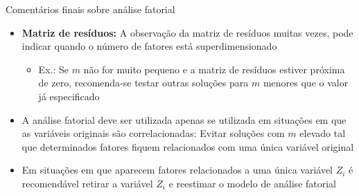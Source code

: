\documentclass[
  ignorenonframetext,
  aspectratio=169,
]{beamer}
\providecommand{\tightlist}{%
  \setlength{\itemsep}{0pt}\setlength{\parskip}{0pt}}
\begin{document}
\begin{frame}{Comentários finais sobre análise fatorial}
\label{comentuxe1rios-finais-sobre-anuxe1lise-fatorial}
\begin{itemize}
\tightlist
\item
  \textbf{Matriz de resíduos:} A observação da matriz de resíduos muitas
  vezes, pode indicar quando o número de fatores está superdimensionado

  \begin{itemize}
  \tightlist
  \item
    Ex.: Se \(m\) não for muito pequeno e a matriz de resíduos estiver
    próxima de zero, recomenda-se testar outras soluções para \(m\)
    menores que o valor já especificado
  \end{itemize}
\end{itemize}

\vspace{0.3cm}

\pause

\begin{itemize}
\tightlist
\item
  A análise fatorial deve ser utilizada apenas se utilizada em situações
  em que as variáveis originais são correlacionadas: Evitar soluções com
  \(m\) elevado tal que determinados fatores fiquem relacionados com uma
  única variável original
\end{itemize}

\vspace{0.3cm}

\pause

\begin{itemize}
\tightlist
\item
  Em situações em que aparecem fatores relacionados a uma única variável
  \(Z_i\) é recomendável retirar a variável \(Z_i\) e reestimar o modelo
  de análise fatorial
\end{itemize}
\end{frame}
\end{document}
